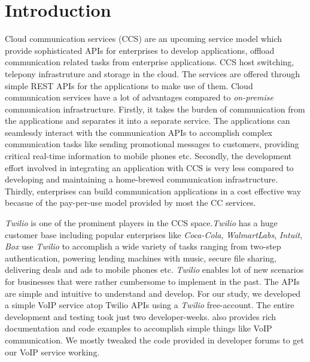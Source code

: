 \section{Introduction}
\label{sec-intro}
Cloud communication services (CCS) are an upcoming service model which provide sophisticated APIs for enterprises to develop applications, offload communication related tasks from enterprise applications. CCS host switching, telepony infrastruture and storage in the cloud. The services are offered through simple REST APIs for the applications to make use of them. Cloud communication services have a lot of advantages compared to \textit{on-premise} communication infrastructure. Firstly, it takes the burden of communication from the applications and separates it into a separate service. The applications can seamlessly interact with the communication APIs to accomplish complex communication tasks like sending promotional messages to customers, providing critical real-time information to mobile phones etc. Secondly, the development effort involved in integrating an application with CCS is very less compared to developing and maintaining a home-brewed communication infrastructure.
Thirdly, enterprises can build communication applications in a cost effective way becasue of the pay-per-use model provided by most the CC services. \par
\textit{Twilio} is one of the prominent players in the CCS space.\textit{Twilio} has a huge customer base  including popular enterprises like \textit{Coca-Cola}, \textit{WalmartLabs}, \textit{Intuit}, \textit{Box} use \textit{Twilio} to accomplish a wide variety of tasks ranging from two-step authentication, powering lending machines with music, secure file sharing, delivering deals and ads to mobile phones etc. \textit{Twilio} enables lot of new scenarios for businesses that were rather cumbersome to implement in the past. The APIs are simple and intuitive to understand and develop. For our study, we developed a simple VoIP service atop Twilio APIs using a \textit{Twilio} free-account. The entire development and testing took just two developer-weeks.  also provides rich documentation and code examples to accomplish simple things like VoIP communication. We mostly tweaked the code provided in developer forums to get our VoIP service working.   